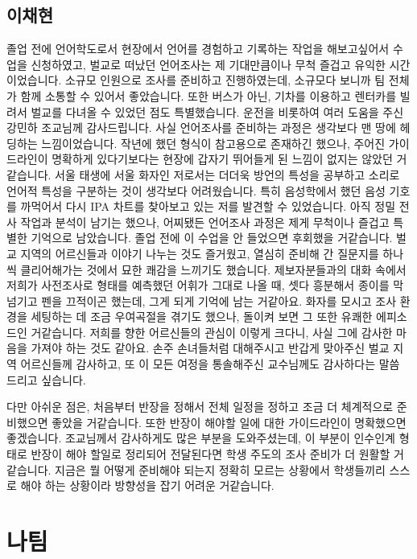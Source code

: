 \subsection{이채현}
졸업 전에 언어학도로서 현장에서 언어를 경험하고 기록하는 작업을 해보고싶어서 수업을 신청하였고, 벌교로 떠났던 언어조사는 제 기대만큼이나 무척 즐겁고 유익한 시간이었습니다. 소규모 인원으로 조사를 준비하고 진행하였는데, 소규모다 보니까 팀 전체가 함께 소통할 수 있어서 좋았습니다. 또한 버스가 아닌, 기차를 이용하고 렌터카를 빌려서 벌교를 다녀올 수 있었던 점도 특별했습니다. 운전을 비롯하여 여러 도움을 주신 강민하 조교님께 감사드립니다. 사실 언어조사를 준비하는 과정은 생각보다 맨 땅에 헤딩하는 느낌이었습니다. 작년에 했던 형식이 참고용으로 존재하긴 했으나, 주어진 가이드라인이 명확하게 있다기보다는 현장에 갑자기 뛰어들게 된 느낌이 없지는 않았던 거 같습니다. 서울 태생에 서울 화자인 저로서는 더더욱 방언의 특성을 공부하고 소리로 언어적 특성을 구분하는 것이 생각보다 어려웠습니다. 특히 음성학에서 했던 음성 기호를 까먹어서 다시 IPA 차트를 찾아보고 있는 저를 발견할 수 있었습니다. 아직 정밀 전사 작업과 분석이 남기는 했으나, 어찌됐든 언어조사 과정은 제게 무척이나 즐겁고 특별한 기억으로 남았습니다. 졸업 전에 이 수업을 안 들었으면 후회했을 거같습니다. 벌교 지역의 어르신들과 이야기 나누는 것도 즐거웠고, 열심히 준비해 간 질문지를 하나씩 클리어해가는 것에서 묘한 쾌감을 느끼기도 했습니다. 제보자분들과의 대화 속에서 저희가 사전조사로 형태를 예측했던 어휘가 그대로 나올 때, 셋다 흥분해서 종이를 막 넘기고 펜을 끄적이곤 했는데, 그게 되게 기억에 남는 거같아요. 화자를 모시고 조사 환경을 세팅하는 데 조금 우여곡절을 겪기도 했으나, 돌이켜 보면 그 또한 유쾌한 에피소드인 거같습니다. 저희를 향한 어르신들의 관심이 이렇게 크다니, 사실 그에 감사한 마음을 가져야 하는 것도 같아요. 손주 손녀들처럼 대해주시고 반갑게 맞아주신 벌교 지역 어르신들께 감사하고, 또 이 모든 여정을 통솔해주신 교수님께도 감사하다는 말씀 드리고 싶습니다.

다만 아쉬운 점은, 처음부터 반장을 정해서 전체 일정을 정하고 조금 더 체계적으로 준비했으면 좋았을 거같습니다. 또한 반장이 해야할 일에 대한 가이드라인이 명확했으면 좋겠습니다. 조교님께서 감사하게도 많은 부분을 도와주셨는데, 이 부분이 인수인계 형태로 반장이 해야 할일로 정리되어 전달된다면 학생 주도의 조사 준비가 더 원활할 거같습니다. 지금은 뭘 어떻게 준비해야 되는지 정확히 모르는 상황에서 학생들끼리 스스로 해야 하는 상황이라 방향성을 잡기 어려운 거같습니다.

\section{나팀}

